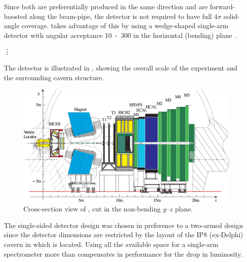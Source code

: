 Since both  are preferentially produced in the same direction
and are forward-boosted along the beam-pipe, the detector is not required
to have full $4\pi$ solid-angle coverage. \LHCb takes advantage of this
by using a wedge-shaped single-arm detector with angular acceptance
\unit{10-300}{\mrad} in the horizontal (bending) plane~\cite{Amato:1998xt}.

\vspace{1cm}

\begin{center}
{\hspace{1mm}\Large\vdots\hspace{1cm}}
\end{center}

\vspace{1cm}

The detector is illustrated in , showing
the overall scale of the experiment and the surrounding cavern structure.

\begin{figure}
  \begin{center}
  \includegraphics[width=0.8\textheight]{diagrams/chips/lhcb-detector-cross-section}
  \caption[Cross-section view of \LHCb, cut in the non-bending $y$--$z$ plane]%
    {Cross-section view of \LHCb, cut in the non-bending $y$--$z$ plane.}
  \label{fig:LHCbCrossSection}
  \end{center}
\end{figure}

The single-sided detector design was chosen in preference to a two-armed
design since the detector dimensions are restricted by the layout of the
IP8 (ex-Delphi) cavern in which \LHCb is located. Using all the available
space for a single-arm spectrometer more than compensates in performance
for the \about{50\percent} drop in luminosity.

